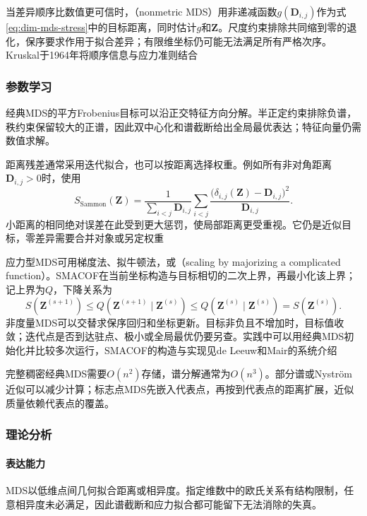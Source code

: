 当差异顺序比数值更可信时，（nonmetric MDS）用非递减函数$g(\bm{D}_{i,j})$作为式\eqref{eq:dim-mds-stress}中的目标距离，同时估计$g$和$\bm{Z}$。尺度约束排除共同缩到零的退化，保序要求作用于拟合差异；有限维坐标仍可能无法满足所有严格次序。Kruskal于1964年将顺序信息与应力准则结合

\subsubsection{参数学习}

经典MDS的平方Frobenius目标可以沿正交特征方向分解。半正定约束排除负谱，秩约束保留较大的正谱，因此双中心化和谱截断给出全局最优表达；特征向量仍需数值求解。

距离残差通常采用迭代拟合，也可以按距离选择权重。例如所有非对角距离$\bm{D}_{i,j}>0$时，使用
\begin{equation}
  \label{eq:dim-sammon}
  S_{\mathrm{Sammon}}(\bm{Z})
  =\frac{1}{\sum_{i<j}\bm{D}_{i,j}}
    \sum_{i<j}
    \frac{\bigl(\delta_{i,j}(\bm{Z})-\bm{D}_{i,j}\bigr)^2}
         {\bm{D}_{i,j}}.
\end{equation}
小距离的相同绝对误差在此受到更大惩罚，使局部距离更受重视。它仍是近似目标，零差异需要合并对象或另定权重

应力型MDS可用梯度法、拟牛顿法，或（scaling by majorizing a complicated function）。SMACOF在当前坐标构造与目标相切的二次上界，再最小化该上界；记上界为$Q$，下降关系为
\[
  S(\bm{Z}^{(s+1)})
  \leq Q(\bm{Z}^{(s+1)}\mid\bm{Z}^{(s)})
  \leq Q(\bm{Z}^{(s)}\mid\bm{Z}^{(s)})
  =S(\bm{Z}^{(s)}).
\]
非度量MDS可以交替求保序回归和坐标更新。目标非负且不增加时，目标值收敛；迭代点是否到达驻点、极小或全局最优仍要另查。实践中可以用经典MDS初始化并比较多次运行，SMACOF的构造与实现见de Leeuw和Mair的系统介绍

完整稠密经典MDS需要$O(n^2)$存储，谱分解通常为$O(n^3)$。部分谱或Nystr\"om近似可以减少计算；标志点MDS先嵌入代表点，再按到代表点的距离扩展，近似质量依赖代表点的覆盖。

\subsubsection{理论分析}
\label{sec:dim-mds-theory}

\paragraph{表达能力}
MDS以低维点间几何拟合距离或相异度。指定维数中的欧氏关系有结构限制，任意相异度未必满足，因此谱截断和应力拟合都可能留下无法消除的失真。


